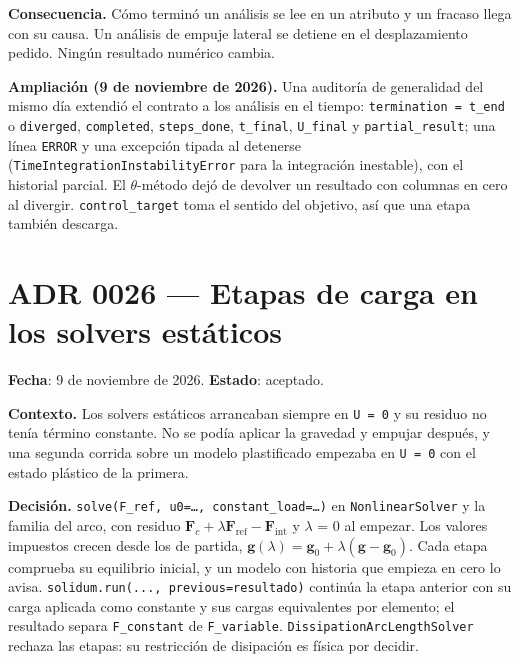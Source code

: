\documentclass[11pt,oneside]{report}
\begin{document}
\textbf{Consecuencia.} Cómo terminó un análisis se lee en un atributo y un fracaso llega con su causa. Un análisis de empuje lateral se detiene en el desplazamiento pedido. Ningún resultado numérico cambia.

\textbf{Ampliación (9 de noviembre de 2026).} Una auditoría de generalidad del mismo día extendió el contrato a los análisis en el tiempo: \texttt{termination = \textquotedbl{}t\_\allowbreak{}end\textquotedbl{}} o \texttt{\textquotedbl{}diverged\textquotedbl{}}, \texttt{completed}, \texttt{steps\_done}, \texttt{t\_final}, \texttt{U\_final} y \texttt{partial\_result}; una línea \texttt{ERROR} y una excepción tipada al detenerse (\texttt{TimeIntegrationInstabilityError} para la integración inestable), con el historial parcial. El \ensuremath{\theta}-método dejó de devolver un resultado con columnas en cero al divergir. \texttt{control\_target} toma el sentido del objetivo, así que una etapa también descarga.

\section{ADR 0026 --- Etapas de carga en los solvers estáticos}
\label{adr:0026}

\textbf{Fecha}: 9 de noviembre de 2026. \textbf{Estado}: aceptado.

\textbf{Contexto.} Los solvers estáticos arrancaban siempre en \texttt{U = 0} y su residuo no tenía término constante. No se podía aplicar la gravedad y empujar después, y una segunda corrida sobre un modelo plastificado empezaba en \texttt{U = 0} con el estado plástico de la primera.

\textbf{Decisión.} \texttt{solve(F\_\allowbreak{}ref, u0=\ldots{}, constant\_\allowbreak{}load=\ldots{})} en \texttt{NonlinearSolver} y la familia del arco, con residuo $\mathbf F_c + \lambda\mathbf F_\text{ref} - \mathbf F_\text{int}$ y \ensuremath{\lambda} = 0 al empezar. Los valores impuestos crecen desde los de partida, $\mathbf g(\lambda) = \mathbf g_0 + \lambda(\mathbf g - \mathbf g_0)$. Cada etapa comprueba su equilibrio inicial, y un modelo con historia que empieza en cero lo avisa. \texttt{solidum.\allowbreak{}run(.\allowbreak{}.\allowbreak{}.\allowbreak{}, previous=resultado)} continúa la etapa anterior con su carga aplicada como constante y sus cargas equivalentes por elemento; el resultado separa \texttt{F\_constant} de \texttt{F\_variable}. \texttt{DissipationArcLengthSolver} rechaza las etapas: su restricción de disipación es física por decidir.
\end{document}
